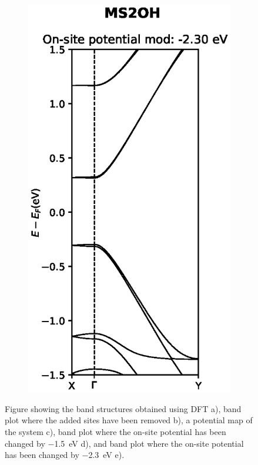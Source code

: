 \begin{figure}[h]
\begin{subfigure}[b]{0.3\textwidth}
		\vspace{-2.5\baselineskip}
		\caption{}
		\label{MS2OHmod1}
	\end{subfigure}
	~
	\begin{subfigure}[b]{0.3\textwidth}
		\centering
		\includegraphics[width=\textwidth]{Figures/MS2OHmod2.eps}
		\vspace{-2.5\baselineskip}
		\caption{}
		\label{MS2OHdevmod2}
	\end{subfigure}
	\caption{Figure showing the band structures obtained using DFT a), band plot where the added sites have been removed b), a potential map of the system c), band plot where the on-site potential has been changed by \SI{-1.5}{\electronvolt} d), and band plot where the on-site potential has been changed by \SI{-2.3}{\electronvolt} e).}
	\label{MS2OH}
\end{figure}
